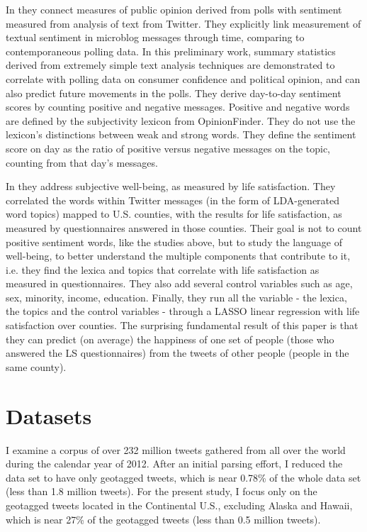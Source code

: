 \documentclass{llncs}
\begin{document}
In \cite{Connor2010} they connect measures of public opinion derived from polls with sentiment measured from analysis of text from Twitter. They explicitly link measurement of textual sentiment in microblog messages through time, comparing to contemporaneous polling data. In this preliminary work, summary statistics derived from extremely simple text analysis techniques are demonstrated to correlate with polling data on consumer confidence and political opinion, and can also predict future movements in the polls. They derive day-to-day sentiment scores by counting positive and negative messages. Positive and negative words are defined by the subjectivity lexicon from OpinionFinder. They do not use the lexicon's distinctions between weak and strong words. They define the sentiment score on day as the ratio of positive versus negative messages on the topic, counting from that day's messages.

In \cite{Schwartz2013} they address subjective well-being, as measured by life satisfaction. They correlated the words within Twitter messages (in the form of LDA-generated word topics) mapped to U.S. counties, with the results for life satisfaction, as measured by questionnaires answered in those counties. Their goal is not to count positive sentiment words, like the studies above, but to study the language of well-being, to better understand the multiple components that contribute to it, i.e. they find the lexica and topics that correlate with life satisfaction as measured in questionnaires. They also add several control variables such as age, sex, minority, income, education. Finally, they run all the variable - the lexica, the topics and the control variables - through a LASSO linear regression with life satisfaction over counties. The surprising fundamental result of this paper is that they can predict (on average) the happiness of one set of people (those who answered the LS questionnaires) from the tweets of other people (people in the same county).

\section{Datasets}
\label{sec:datasets}

I examine a corpus of over 232 million tweets gathered from all over the world during the calendar year of 2012. After an initial parsing effort, I reduced the data set to have only geotagged tweets, which is near 0.78\% of the whole data set (less than 1.8 million tweets). For the present study, I focus only on the geotagged tweets located in the Continental U.S., excluding Alaska and Hawaii, which is near 27\% of the geotagged tweets (less than 0.5 million tweets).
\end{document}
